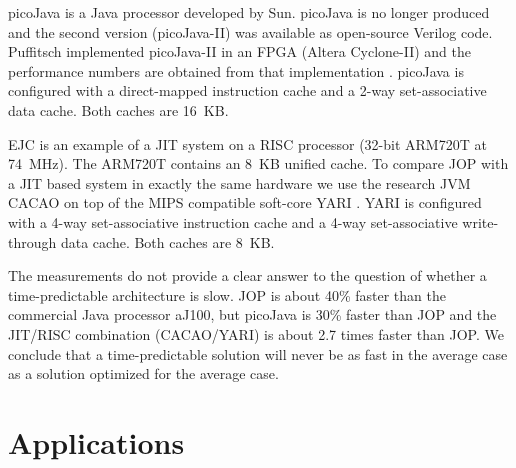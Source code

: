 picoJava \cite{pJ1} is a Java processor developed by Sun. picoJava is
no longer produced and the second version (picoJava-II) was available
as open-source Verilog code. Puffitsch implemented picoJava-II in an
FPGA (Altera Cyclone-II) and the performance numbers are obtained
from that implementation \cite{master:puffitsch}. picoJava is
configured with a direct-mapped instruction cache and a 2-way
set-associative data cache. Both caches are 16~KB.

EJC \cite{EJC} is an example of a JIT system on a RISC processor
(32-bit ARM720T at 74~MHz). The ARM720T contains an 8~KB unified
cache. To compare JOP with a JIT based system in exactly the same
hardware we use the research JVM CACAO \cite{cacao} on top of the
MIPS compatible soft-core YARI \cite{cacao:yari}. YARI is configured
with a 4-way set-associative instruction cache and a 4-way
set-associative write-through data cache. Both caches are 8~KB.

The measurements do not provide a clear answer to the question of
whether a time-predictable architecture is slow. JOP is about 40\%
faster than the commercial Java processor aJ100, but picoJava is 30\%
faster than JOP and the JIT/RISC combination (CACAO/YARI) is about
2.7 times faster than JOP. We conclude that a time-predictable
solution will never be as fast in the average case as a solution
optimized for the average case.



\section{Applications}
\label{sec:applications}


